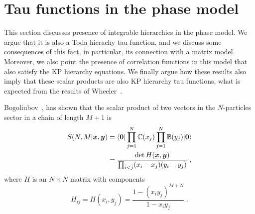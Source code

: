 \documentclass[a4paper,11pt]{amsart}
\begin{document}

\section{Tau functions in the phase model}

This section discusses presence of integrable hierarchies in the phase
model.  We argue that it is also a Toda hierachy tau function, and we
discuss some consequences of this fact, in particular, its connection
with a matrix model. Moreover, we also point the presence of
correlation functions in this model that also satisfy the KP hierarchy
equations. We finally argue how these results also imply that these
scalar products are also KP hierarchy tau functions, what is expected from 
the results of Wheeler~\cite{Wheeler:2010vmq}.

Bogoliubov~\cite{Bogoliubov2005}, has shown that the scalar product of
two vectors in the \(N\)-particles sector in a chain of length \(M+1\)
is
\begin{equation}
\begin{split}
\label{eq:scalar}
  S(N, M|\bm{x}, \bm{y}) & =
  \langle\bm{0}\rvert \prod_{j=1}^N \mathbb{C}(x_j) \prod_{j=1}^N \mathbb{B}(y_j) \lvert\bm{0}\rangle \\ 
 & = \frac{ \det H(\bm{x},\bm{y})}{ \prod_{i<j}(x_i - x_j)(y_i - y_j)} \; ,
\end{split}
\end{equation}
where \(H\) is an \(N\times N\) matrix with components
\begin{equation}
  H_{ij} = H(x_i, y_j) 
  =\frac{1 - (x_i y_j)^{ M + N}}{1 - x_i y_j }\; .
\end{equation}

\end{document}
